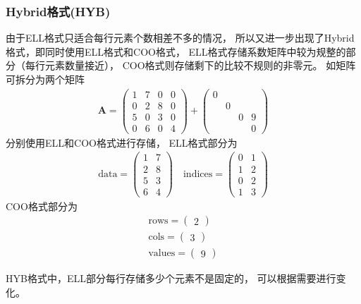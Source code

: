\subsubsection{Hybrid格式(HYB)}
由于ELL格式只适合每行元素个数相差不多的情况，
所以又进一步出现了Hybrid格式，即同时使用ELL格式和COO格式，
ELL格式存储系数矩阵中较为规整的部分（每行元素数量接近），
COO格式则存储剩下的比较不规则的非零元。\cite{bell2008spmv}
如矩阵
可拆分为两个矩阵
\begin{align*}
\bm{A}=\begin{pmatrix}
1 & 7 & 0 & 0\\
0 & 2 & 8 & 0\\
5 & 0 & 3 & 0\\
0 & 6 & 0 & 4
\end{pmatrix}
+
\begin{pmatrix}
0 &  &  & \\
 & 0 &  & \\
 &  & 0 & 9\\
 &  &  & 0
\end{pmatrix}
\end{align*}
分别使用ELL和COO格式进行存储，
ELL格式部分为
\begin{align*}
\mathrm{data}=\begin{pmatrix}
1 & 7\\
2 & 8\\
5 & 3\\
6 & 4
\end{pmatrix}
\quad
\mathrm{indices}=\begin{pmatrix}
0 & 1\\
1 & 2\\
0 & 2\\
1 & 3
\end{pmatrix}
\end{align*}
COO格式部分为
\begin{align*}
\mathrm{rows}=\begin{pmatrix}
2
\end{pmatrix}
\\
\mathrm{cols}=\begin{pmatrix}
3
\end{pmatrix}
\\
\mathrm{values}=\begin{pmatrix}
9
\end{pmatrix}
\end{align*}

HYB格式中，ELL部分每行存储多少个元素不是固定的，
可以根据需要进行变化。


